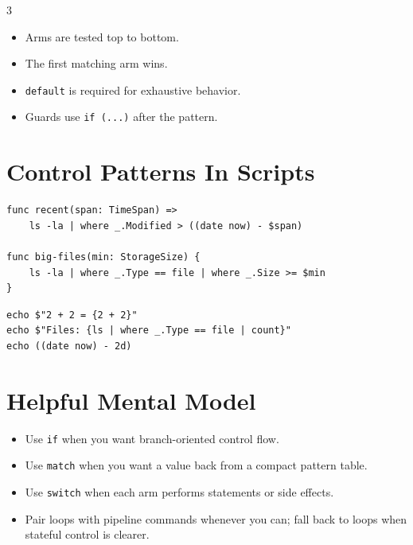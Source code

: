 \begin{multicols*}{3}
\begin{itemize}
\item Arms are tested top to bottom.
\item The first matching arm wins.
\item \texttt{default} is required for exhaustive behavior.
\item Guards use \texttt{if (...)} after the pattern.
\end{itemize}

\section{Control Patterns In Scripts}
\begin{lstlisting}
func recent(span: TimeSpan) =>
    ls -la | where _.Modified > ((date now) - $span)

func big-files(min: StorageSize) {
    ls -la | where _.Type == file | where _.Size >= $min
}
\end{lstlisting}

\begin{lstlisting}
echo $"2 + 2 = {2 + 2}"
echo $"Files: {ls | where _.Type == file | count}"
echo ((date now) - 2d)
\end{lstlisting}

\section{Helpful Mental Model}
\begin{itemize}
\item Use \texttt{if} when you want branch-oriented control flow.
\item Use \texttt{match} when you want a value back from a compact pattern table.
\item Use \texttt{switch} when each arm performs statements or side effects.
\item Pair loops with pipeline commands whenever you can; fall back to loops when stateful control is clearer.
\end{itemize}


\end{multicols*}
\newpage


